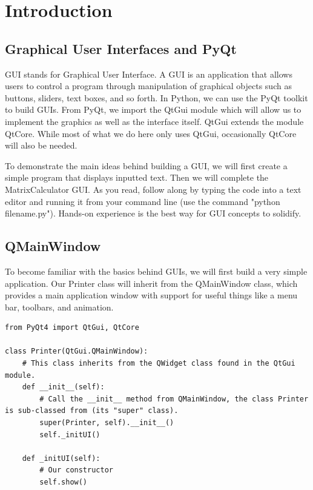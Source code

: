 \label{lab:GUI}

\section*{Introduction}
\subsection*{Graphical User Interfaces and PyQt}
GUI stands for Graphical User Interface.  A GUI is an application that allows users to control a program through manipulation of graphical objects such as buttons, sliders, text boxes, and so forth.  In Python, we can use the PyQt toolkit to build GUIs.  From PyQt, we import the QtGui module which will allow us to implement the graphics as well as the interface itself. QtGui extends the module QtCore.  While most of what we do here only uses QtGui, occasionally QtCore will also be needed. 

To demonstrate the main ideas behind building a GUI, we will first create a simple program that displays inputted text. Then we will complete the MatrixCalculator GUI.  As you read, follow along by typing the code into a text editor and running it from your command line (use the command "python filename.py"). Hands-on experience is the best way for GUI concepts to solidify.

\subsection*{QMainWindow}
To become familiar with the basics behind GUIs, we will first build a very simple application.  Our Printer class will inherit from the QMainWindow class, which provides a main application window with support for useful things like a menu bar, toolbars, and animation.

\begin{lstlisting}
from PyQt4 import QtGui, QtCore

class Printer(QtGui.QMainWindow):
	# This class inherits from the QWidget class found in the QtGui module.
	def __init__(self):
		# Call the __init__ method from QMainWindow, the class Printer is sub-classed from (its "super" class).
		super(Printer, self).__init__()
		self._initUI()
	
	def _initUI(self):
		# Our constructor
		self.show()

\end{lstlisting}

